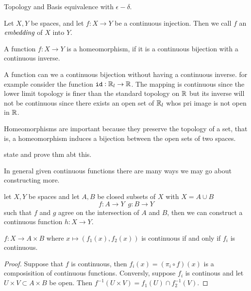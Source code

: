 \begin{chapter}{Topology and Basis}
   equivalence with $\epsilon-\delta$. 

   
   \begin{defn}
    Let $X, Y$ be spaces, and let $f:X \to Y$ be a continuous injection. Then we call $f$ an $\emph{embedding}$ 
    of $X$ into $Y$. 
   \end{defn}

   \begin{defn}
    A function $f:X \to Y$ is a homeomorphism, if it is a continuous bijection with a continuous inverse. 
   \end{defn}

   
   \begin{ex}
    A function can we a continuous bijection without having a continuous inverse. for example 
    consider the function ${\tt id}:\mathbb{R}_l \to \mathbb{R}$. The mapping is continuous since the lower limit topology 
    is finer than the standard topology on $\mathbb{R}$ but its inverse will not be continuous since there exists 
    an open set of $\mathbb{R}_l$ whos pri image is not open in $\mathbb{R}$. 
   \end{ex}


    Homeomorphisms are important because they preserve the topology of a set, that is, a homeomorphism induces a bijection 
    between the open sets of two spaces. 

   state and prove thm abt this. 

   In general given continuous functions there are many  ways we may go about constructing more. 




   
   \begin{thm}
    let $X, Y$ be spaces and let $A,B$ be closed subsets of $X$ with $X = A \cup B$
    \[f:A \to Y \, \, \, g:B \to Y\]
    such that $f$ and $g$ agree on the intersection of $A$ and $B$, 
    then we can construct a continuous function $h:X \to Y$. 
   \end{thm}


   \begin{thm}
    $f:X \to A \times B$ where $x \mapsto (f_1(x), f_2(x))$ 
    is continuous if and only if $f_i$ is continuous. 
   \end{thm}

   \begin{proof}
    Suppose that $f$ is continuous, then $f_i(x) = (\pi_i \circ f )(x)$ is a composisition of continuous functions. 
    Conversly, suppose $f_i$ is continous and let $U \times V \subset A \times B$ be open. 
    Then $f^{-1}(U \times V) = f_1(U) \cap f_2^{-1}(V)$. 
   \end{proof}


\end{chapter}
